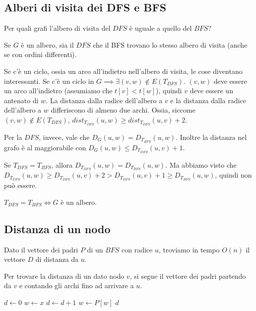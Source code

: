 \clearpage

\subsection{Alberi di visita dei DFS e BFS}

\begin{esercizio}
Per quali grafi l'albero di visita del $DFS$ \`e uguale a quello del $BFS$?
\end{esercizio}

\begin{oss}
Se $G$ \`e un albero, sia il $DFS$ che il BFS trovano lo stesso albero di visita (anche se con ordini differenti).
\end{oss}

Se c'\`e un ciclo, ossia un arco all'indietro nell'albero di visita, le cose diventano interessanti. Se c'\`e un ciclo in $G \implies \exists (v, w) \notin E(T_{DFS})$. $(v,w)$ deve essere un arco all'indietro (assumiamo che $t[v] < t[w]$), quindi $v$ deve essere un antenato di $w$. La distanza dalla radice dell'albero a $v$ e la distanza dalla radice dell'albero a $w$ differiscono di almeno due archi. Ossia, siccome $(v,w) \notin E(T_{DFS})$, $dist_{T_{DFS}} (u,w) \ge dist_{T_{DFS}} (u,v) + 2$.

Per la $DFS$, invece, vale che $D_G(u,w) = D_{T_{BFS}} (u,w)$. Inoltre la distanza nel grafo \`e al maggiorabile con $D_G(u,w) \le D_{T_{DFS}} (u,v) + 1$.

Se $T_{DFS} = T_{BFS}$, allora $D_{T_{DFS}} (u,w) = D_{T_{BFS}} (u,w)$. Ma abbiamo visto che $D_{T_{DFS}} (u,w) \ge D_{T_{DFS}} (u,v) + 2 > D_{T_{DFS}} (u,v) + 1 \ge D_{T_{BFS}} (u,w)$, quindi non pu\`o essere.

$T_{DFS} = T_{BFS} \iff G$ \`e un albero.

\clearpage

\subsection{Distanza di un nodo}

\begin{esercizio}
Dato il vettore dei padri $P$ di un $BFS$ con radice $u$, troviamo in tempo $O(n)$ il vettore $D$ di distanza da $u$.
\end{esercizio}

Per trovare la distanza di un dato nodo $v$, si segue il vettore dei padri partendo da $v$ e contando gli archi fino ad arrivare a $u$.

\begin{algorithm}
\caption{Algoritmo per determinare la distanza di un nodo}
\begin{algorithmic}[1]
\State $d \gets 0$
\State $w \gets x$
    \State $d \gets d + 1$
    \State $w \gets P[w]$
\EndWhile
\State \Return $d$
\end{algorithmic}
\end{algorithm}

